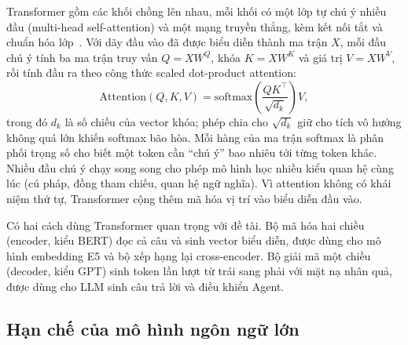 Transformer gồm các khối chồng lên nhau, mỗi khối có một lớp tự chú ý nhiều đầu (multi-head self-attention) và một mạng truyền thẳng, kèm kết nối tắt và chuẩn hóa lớp~\cite{vaswani2017attention}. Với dãy đầu vào đã được biểu diễn thành ma trận $X$, mỗi đầu chú ý tính ba ma trận truy vấn $Q = XW^Q$, khóa $K = XW^K$ và giá trị $V = XW^V$, rồi tính đầu ra theo công thức scaled dot-product attention:
\begin{equation}
    \mathrm{Attention}(Q, K, V) = \mathrm{softmax}\!\left(\frac{QK^{\top}}{\sqrt{d_k}}\right) V,
    \label{eq:attention}
\end{equation}
trong đó $d_k$ là số chiều của vector khóa; phép chia cho $\sqrt{d_k}$ giữ cho tích vô hướng không quá lớn khiến softmax bão hòa. Mỗi hàng của ma trận softmax là phân phối trọng số cho biết một token cần ``chú ý'' bao nhiêu tới từng token khác. Nhiều đầu chú ý chạy song song cho phép mô hình học nhiều kiểu quan hệ cùng lúc (cú pháp, đồng tham chiếu, quan hệ ngữ nghĩa). Vì attention không có khái niệm thứ tự, Transformer cộng thêm mã hóa vị trí vào biểu diễn đầu vào.

Có hai cách dùng Transformer quan trọng với đề tài. Bộ mã hóa hai chiều (encoder, kiểu BERT) đọc cả câu và sinh vector biểu diễn, được dùng cho mô hình embedding E5 và bộ xếp hạng lại cross-encoder. Bộ giải mã một chiều (decoder, kiểu GPT) sinh token lần lượt từ trái sang phải với mặt nạ nhân quả, được dùng cho LLM sinh câu trả lời và điều khiển Agent.

\subsection{Hạn chế của mô hình ngôn ngữ lớn}
\label{sec:llm_limits}


